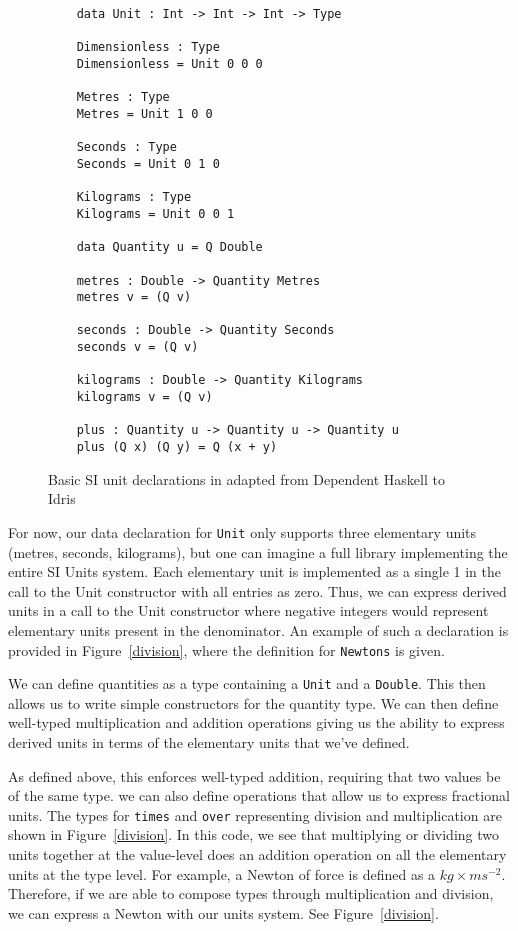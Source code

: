 \begin{figure}[ht!]
  \label{idris_code}
  \caption{Basic SI unit declarations in adapted from Dependent Haskell to Idris \protect\cite{gundry2013}}
  \begin{lstlisting}
    data Unit : Int -> Int -> Int -> Type
    
    Dimensionless : Type
    Dimensionless = Unit 0 0 0
    
    Metres : Type
    Metres = Unit 1 0 0
    
    Seconds : Type
    Seconds = Unit 0 1 0
    
    Kilograms : Type
    Kilograms = Unit 0 0 1
    
    data Quantity u = Q Double
    
    metres : Double -> Quantity Metres
    metres v = (Q v)
    
    seconds : Double -> Quantity Seconds
    seconds v = (Q v)
    
    kilograms : Double -> Quantity Kilograms
    kilograms v = (Q v)
    
    plus : Quantity u -> Quantity u -> Quantity u
    plus (Q x) (Q y) = Q (x + y)
  \end{lstlisting}
\end{figure}

For now, our data declaration for \texttt{Unit} only supports three elementary
units (metres, seconds, kilograms), but one can imagine a full library
implementing the entire SI Units system. Each elementary unit is implemented as
a single 1 in the call to the Unit constructor with all entries as zero. Thus,
we can express derived units in a call to the Unit constructor where negative
integers would represent elementary units present in the denominator. An example
of such a declaration is provided in Figure~\ref{division}, where the definition
for \texttt{Newtons} is given. 

We can define quantities as a type containing a \texttt{Unit} and a
\texttt{Double}. This then allows us to write simple constructors for the
quantity type. We can then define well-typed multiplication and addition
operations giving us the ability to express derived units in terms of the
elementary units that we've defined. 

As defined above, this enforces well-typed addition, requiring that two
values be of the same type. we can also define operations that allow us to
express fractional units. The types for \texttt{times} and \texttt{over}
representing division and multiplication are shown in Figure~\ref{division}. In
this code, we see that multiplying or dividing two units together at the
value-level does an addition operation on all the elementary units at the type
level. For example, a Newton of force is defined as a $kg\times ms^{-2}$.
Therefore, if we are able to compose types through multiplication and division,
we can express a Newton with our units system. See Figure~\ref{division}. 

